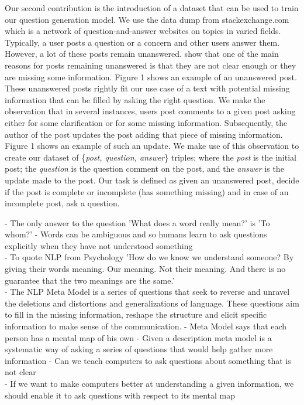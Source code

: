 \documentclass[11pt]{article}
\begin{document}
Our second contribution is the introduction of a dataset that can be used to train our question generation model. We use the data dump from stackexchange.com which is a network of question-and-answer websites on topics in varied fields. Typically, a user posts a question or a concern and other users answer them. However, a lot of these posts remain unanswered. \cite{asaduzzaman2013answering} show that one of the main reasons for posts remaining unanswered is that they are not clear enough or they are missing some information. Figure 1 shows an example of an unanswered post. These unanswered posts rightly fit our use case of a text with potential missing information that can be filled by asking the right question. We make the observation that in several instances, users post comments to a given post asking either for some clarification or for some missing information. Subsequently, the author of the post updates the post adding that piece of missing information. Figure 1 shows an example of such an update. We make use of this observation to create our dataset of \{\textit{post, question, answer}\} triples; where the \textit{post} is the initial post; the \textit{question} is the question comment on the post, and the \textit{answer} is the update made to the post. Our task is defined as given an unanswered post, decide if the post is complete or incomplete (has something missing) and in case of an incomplete post, ask a question. 

\iffalse
- The only answer to the question 'What does a word really mean?' is 'To whom?'
- Words can be ambiguous and so humans learn to ask questions explicitly when they have not understood something \\
- To quote NLP from Psychology \cite{o2011introducing} 'How do we know we understand someone? By giving their words meaning. Our meaning. Not  their meaning. And there is no guarantee that the two meanings are the same.' \\
- The NLP Meta Model \cite{bandler1975structure} is a series of questions that seek to reverse and unravel the deletions and distortions and generalizations of language. These questions aim to fill in the missing information, reshape the structure and elicit specific information to make sense of the communication.
- Meta Model says that each person has a mental map of his own
- Given a description meta model is a systematic way of asking a series of questions that would help gather more information 
- Can we teach computers to ask questions about something that is not clear \\
- If we want to make computers better at understanding a given information, we should enable it to ask questions with respect to its mental map
\end{document}
